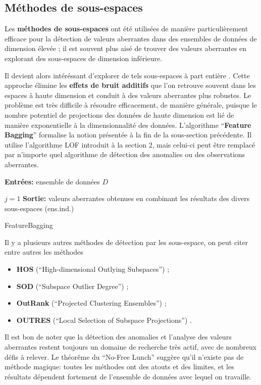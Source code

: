 \subsection{Méthodes de sous-espaces}
%
%
Les \textbf{m\'ethodes de sous-espaces} ont été utilisées de manière particulièrement efficace pour la détection de valeurs aberrantes dans des ensembles de donn\'ees de dimension \'elev\'ee \cite{A8,A13,A14}; il est souvent plus ais\'e de trouver des valeurs aberrantes en explorant  des sous-espaces de dimension inf\'erieure. \par Il devient alors int\'er\'essant d'explorer de tels sous-espaces \`a part enti\`ere \cite{A1,Aurore}. Cette approche élimine les \textbf{effets de bruit additifs} que l'on retrouve souvent dans les espaces \`a haute dimension et conduit à des valeurs aberrantes plus robustes. \newl Le  problème est très difficile à résoudre efficacement, de mani\`ere g\'en\'erale, puisque le nombre potentiel de projections des données de haute dimension est lié de manière exponentielle à la dimensionnalité des données. \newl L'algorithme ``\textbf{Feature Bagging}'' formalise la notion pr\'esent\'ee \`a la fin de la sous-section pr\'ec\'edente. Il utilise l'al\-go\-ri\-thme LOF introduit \`a la section 2, mais celui-ci peut \^etre remplac\'e par n'importe quel algorithme de d\'etection des anomalies ou des observations aberrantes.  

\begin{algorithm}
\SetAlgoLined
\textbf{Entr\'ees:} ensemble de donn\'ees $D$

$j=1$\;
\textbf{Sortie:} valeurs aberrantes obtenues en combinant les r\'esultats des divers sous-espaces (ens.\@ ind.)
\caption{FeatureBagging}
\end{algorithm}
\noindent Il y a plusieurs autres m\'ethodes de d\'etection par les sous-espace, on peut citer entre autres les m\'ethodes 
\begin{itemize}[noitemsep]
\item \textbf{HOS} (``High-dimensional Outlying Subspaces'') \cite{Zhang}; \item \textbf{SOD} (``Subspace Outlier Degree'') \cite{Zi};%
\item \textbf{OutRank} (``Projected Clustering Ensembles'') \cite{M1}; 
\item \textbf{OUTRES} (``Local Selection of Subspace Projections'') \cite{M3}.
\end{itemize}
Il est bon de noter que la détection des anomalies et l'analyse des valeurs aberrantes restent toujours un domaine de recherche très actif, avec de nombreux défis à relever. Le th\'eor\^eme du ``No-Free Lunch'' sugg\`ere qu'il n'existe pas de méthode magique: toutes les méthodes ont des atouts et des limites, et les r\'esultats d\'ependent fortement de l'ensemble de donn\'ees avec lequel on travaille. 
\afterpage{\FloatBarrier}